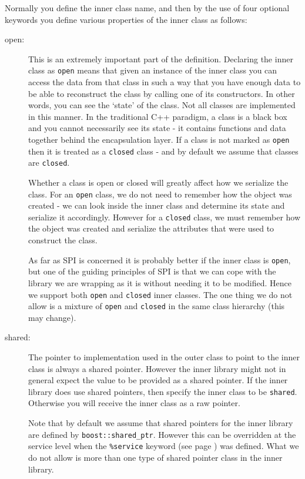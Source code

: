 Normally you define the inner class name, and then by the use of four optional keywords you define various properties of the inner class as follows:
\begin{description}
\item[open:] This is an extremely important part of the definition.
Declaring the inner class as \texttt{open} means that given an instance of the inner class you can access the data from that class in such a way that you have enough data to be able to reconstruct the class by calling one of its constructors.
In other words, you can see the `state' of the class.
Not all classes are implemented in this manner.
In the traditional C++ paradigm, a class is a black box and you cannot necessarily see its state - it contains functions and data together behind the encapsulation layer.
If a class is not marked as \texttt{open} then it is treated as a \texttt{closed} class - and by default we assume that classes are \texttt{closed}.

Whether a class is open or closed will greatly affect how we serialize the class.
For an \texttt{open} class, we do not need to remember how the object was created - we can look inside the inner class and determine its state and serialize it accordingly.
However for a \texttt{closed} class, we must remember how the object was created and serialize the attributes that were used to construct the class.

As far as SPI is concerned it is probably better if the inner class is \texttt{open}, but one of the guiding principles of SPI is that we can cope with the library we are wrapping as it is without needing it to be modified.
Hence we support both \texttt{open} and \texttt{closed} inner classes.
The one thing we do not allow is a mixture of \texttt{open} and \texttt{closed} in the same class hierarchy (this may change).

\item[shared:] The pointer to implementation used in the outer class to point to the inner class is always a shared pointer.
However the inner library might not in general expect the value to be provided as a shared pointer.
If the inner library does use shared pointers, then specify the inner class to be \texttt{shared}.
Otherwise you will receive the inner class as a raw pointer.

Note that by default we assume that shared pointers for the inner library are defined by \verb|boost::shared_ptr|.
However this can be overridden at the service level when the \texttt{\%service} keyword (see page \pageref{service}) was defined.
What we do not allow is more than one type of shared pointer class in the inner library.


\end{description}
